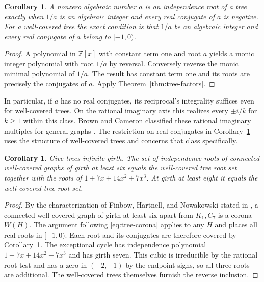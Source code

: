 \documentclass[11pt,a4paper]{article}
\newtheorem{corollary}[theorem]{Corollary}
\begin{document}
\begin{corollary}\label{cor:tree-arithmetic}
A nonzero algebraic number $a$ is an independence root of a tree
exactly when $1/a$ is an algebraic integer and every real conjugate of
$a$ is negative. For a well-covered tree the exact condition is that
$1/a$ be an algebraic integer and every real conjugate of $a$ belong
to $[-1,0)$.
\end{corollary}
\begin{proof}
A polynomial in $\mathbb Z[x]$ with constant term one and root $a$
yields a monic integer polynomial with root $1/a$ by reversal.
Conversely reverse the monic minimal polynomial of $1/a$. The result
has constant term one and its roots are precisely the conjugates of
$a$. Apply Theorem~\ref{thm:tree-factors}.
\end{proof}

In particular, if $a$ has no real conjugates, its reciprocal's
integrality suffices even for well-covered trees. On the rational
imaginary axis this realizes every $\pm i/k$ for $k\ge1$ within this
class. Brown and Cameron classified these rational imaginary multiples
for general graphs \cite{browncameron}. The restriction on real
conjugates in Corollary~\ref{cor:tree-arithmetic} uses the structure of
well-covered trees and concerns that class specifically.

\begin{corollary}\label{cor:girth-spectrum}
Give trees infinite girth. The set of independence roots of connected
well-covered graphs of girth at least six equals the well-covered tree
root set together with the roots of $1+7x+14x^2+7x^3$. At girth at
least eight it equals the well-covered tree root set.
\end{corollary}
\begin{proof}
By the characterization of Finbow, Hartnell, and Nowakowski stated in
\cite[Theorem~1.1]{levitcorona}, a connected well-covered graph of girth
at least six apart from $K_1,C_7$ is a corona $W(H)$. The argument
following \eqref{eq:tree-corona} applies to any $H$ and places all real
roots in $[-1,0)$. Each root and its conjugates are therefore covered
by Corollary~\ref{cor:tree-arithmetic}. The exceptional cycle has
independence polynomial $1+7x+14x^2+7x^3$ and has girth seven. This
cubic is irreducible by the rational root test and has a zero in
$(-2,-1)$ by the endpoint signs, so all three roots are additional.
The well-covered trees themselves furnish the reverse inclusion.
\end{proof}
\end{document}
